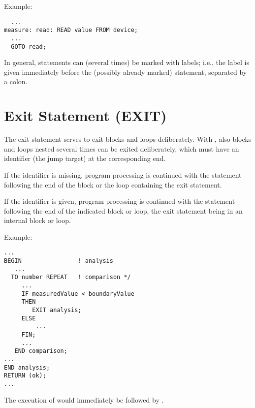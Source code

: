 Example:

\begin{lstlisting}
  ...
measure: read: READ value FROM device;
  ... 
  GOTO read;
\end{lstlisting}

In general, statements can (several times) be marked with labels; i.e.,
the label is given immediately before the (possibly already marked)
statement, separated by a colon.


\section{Exit Statement (EXIT)}    %
\label{sec_exit}

The exit statement serves to exit blocks and loops deliberately. With
, also blocks and loops nested several times can be exited
deliberately, which must have an identifier (the jump target) at the
corresponding end.

\begin{grammarframe}

\end{grammarframe}

If the identifier is missing, program processing is continued with the
statement following the end of the block or the loop containing the exit
statement.

If the identifier is given, program processing is continued with the
statement following the end of the indicated block or loop, the exit
statement being in an internal block or loop.


Example:

\begin{lstlisting}
...
BEGIN                ! analysis 
   ... 
  TO number REPEAT   ! comparison */ 
     ... 
     IF measuredValue < boundaryValue 
     THEN
        EXIT analysis;
     ELSE
         ...
     FIN;
     ... 
   END comparison; 
... 
END analysis;
RETURN (ok);
... 
\end{lstlisting}

The execution of  would immediately be followed by
.


